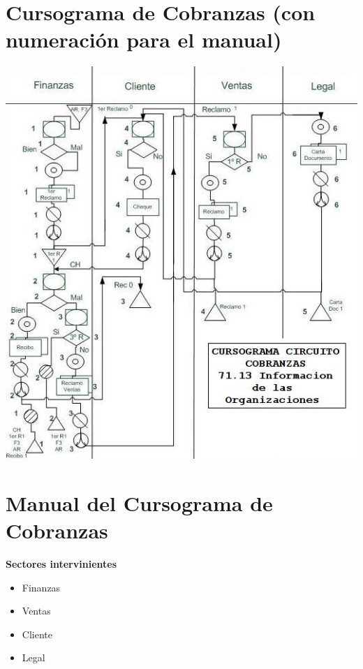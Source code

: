 \section{Cursograma de Cobranzas (con numeración para el manual)}
\begin{center}
 \includegraphics{Empresa/Circuitos/Cobranzas/cursograma-para-manual-cobranzas.jpg}
\end{center}

\pagebreak
\section{Manual del Cursograma de Cobranzas}

\begin{center}\textbf{Sectores intervinientes}\end{center}
\begin{itemize}
  \item Finanzas
  \item Ventas
  \item Cliente
  \item Legal
\end{itemize}

